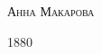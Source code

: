\documentclass[a4paper,12pt]{book}
\begin{document}
\begin{titlepage}
	\vspace{0.5\baselineskip} %
	
	{\scshape\Large Анна Макарова \\} %
	
	\vspace{0.5\baselineskip} %
	
	
	\vfill %
	
	
	\vspace{0.3\baselineskip} %
	
	1880 %
	
	
\end{titlepage}

\renewcommand{\thesection}{\Roman {section}}

\renewcommand{\thesubsection}{\arabic{subsection}}

\renewcommand{\thesubsubsection}{\arabic {subsubsection}}


%

\tableofcontents
\end{document}
